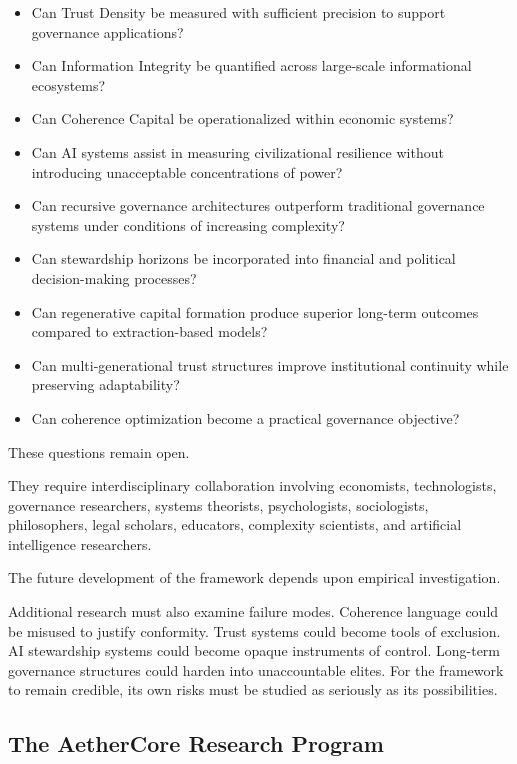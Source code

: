 \documentclass[12pt]{article}
\begin{document}
\begin{itemize}
  \item Can Trust Density be measured with sufficient precision to support governance applications?
  \item Can Information Integrity be quantified across large-scale informational ecosystems?
  \item Can Coherence Capital be operationalized within economic systems?
  \item Can AI systems assist in measuring civilizational resilience without introducing unacceptable concentrations of power?
  \item Can recursive governance architectures outperform traditional governance systems under conditions of increasing complexity?
  \item Can stewardship horizons be incorporated into financial and political decision-making processes?
  \item Can regenerative capital formation produce superior long-term outcomes compared to extraction-based models?
  \item Can multi-generational trust structures improve institutional continuity while preserving adaptability?
  \item Can coherence optimization become a practical governance objective?
\end{itemize}

These questions remain open.

They require interdisciplinary collaboration involving economists, technologists, governance researchers, systems theorists, psychologists, sociologists, philosophers, legal scholars, educators, complexity scientists, and artificial intelligence researchers.

The future development of the framework depends upon empirical investigation.

Additional research must also examine failure modes. Coherence language could be misused to justify conformity. Trust systems could become tools of exclusion. AI stewardship systems could become opaque instruments of control. Long-term governance structures could harden into unaccountable elites. For the framework to remain credible, its own risks must be studied as seriously as its possibilities.

\subsection{The AetherCore Research Program}
\end{document}
